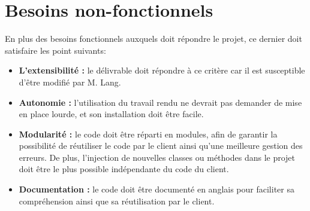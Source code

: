 \section{Besoins non-fonctionnels}
En plus des besoins fonctionnels auxquels doit répondre le projet, ce dernier doit satisfaire les point suivants:\\ 
\begin{itemize}
item[\textbullet] \textbf{Portabilité :} le code doit être écrit de façon à pouvoir en réutiliser la plus grande portion lors du portage sur d'autres systèmes d'exploitation.\\
\item[\textbullet] \textbf{L'extensibilité :} le délivrable doit répondre à ce critère car il est susceptible d'être modifié par M. Lang.\\
\item[\textbullet] \textbf{Autonomie :} l'utilisation du travail rendu ne devrait pas demander de mise en place lourde, et son installation doit être facile.\\
\item[\textbullet] \textbf{ Modularité :} le code doit être réparti en modules, afin de garantir la possibilité de réutiliser le code par le client ainsi qu'une meilleure gestion des erreurs. De plus, l'injection de nouvelles classes ou méthodes dans le projet doit être le plus possible indépendante du code du client.\\ 
\item[\textbullet] \textbf{ Documentation :} le code doit être documenté en anglais pour faciliter sa compréhension ainsi que sa réutilisation par le client.\\

\end{itemize}

